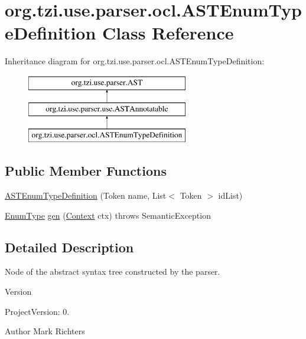 \hypertarget{classorg_1_1tzi_1_1use_1_1parser_1_1ocl_1_1_a_s_t_enum_type_definition}{\section{org.\-tzi.\-use.\-parser.\-ocl.\-A\-S\-T\-Enum\-Type\-Definition Class Reference}
\label{classorg_1_1tzi_1_1use_1_1parser_1_1ocl_1_1_a_s_t_enum_type_definition}
}
Inheritance diagram for org.\-tzi.\-use.\-parser.\-ocl.\-A\-S\-T\-Enum\-Type\-Definition\-:\begin{figure}[H]
\begin{center}
\leavevmode
\includegraphics[height=3.000000cm]{classorg_1_1tzi_1_1use_1_1parser_1_1ocl_1_1_a_s_t_enum_type_definition}
\end{center}
\end{figure}
\subsection*{Public Member Functions}
\begin{DoxyCompactItemize}
\item 
\hyperlink{classorg_1_1tzi_1_1use_1_1parser_1_1ocl_1_1_a_s_t_enum_type_definition_a69a6939c961b595ff8ed22ec8384eaea}{A\-S\-T\-Enum\-Type\-Definition} (Token name, List$<$ Token $>$ id\-List)
\item 
\hyperlink{classorg_1_1tzi_1_1use_1_1uml_1_1ocl_1_1type_1_1_enum_type}{Enum\-Type} \hyperlink{classorg_1_1tzi_1_1use_1_1parser_1_1ocl_1_1_a_s_t_enum_type_definition_a6bcf0b5044db849708de68317588ace4}{gen} (\hyperlink{classorg_1_1tzi_1_1use_1_1parser_1_1_context}{Context} ctx)  throws Semantic\-Exception 
\end{DoxyCompactItemize}


\subsection{Detailed Description}
Node of the abstract syntax tree constructed by the parser.

\begin{DoxyVersion}{Version}

\end{DoxyVersion}
\begin{DoxyParagraph}{Project\-Version\-:}
0. 
\end{DoxyParagraph}
\begin{DoxyAuthor}{Author}
Mark Richters 
\end{DoxyAuthor}


